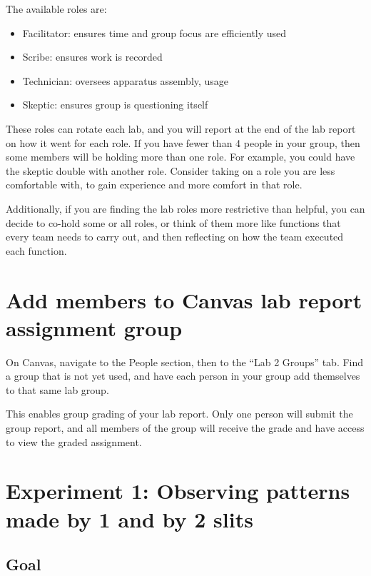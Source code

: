 The available roles are:

\begin{itemize}
	\item Facilitator: ensures time and group focus are efficiently used
	\item Scribe: ensures work is recorded
	\item Technician: oversees apparatus assembly, usage
	\item Skeptic: ensures group is questioning itself
\end{itemize}

These roles can rotate each lab, and you will report at the end of the lab report on how it went for each role. If you have fewer than 4 people in your group, then some members will be holding more than one role. For example, you could have the skeptic double with another role. Consider taking on a role you are less comfortable with, to gain experience and more comfort in that role.

Additionally, if you are finding the lab roles more restrictive than helpful, you can decide to co-hold some or all roles, or think of them more like functions that every team needs to carry out, and then reflecting on how the team executed each function.

\section{Add members to Canvas lab report assignment group}

\begin{steps}
	\item On Canvas, navigate to the People section, then to the ``Lab 2 Groups'' tab. Find a group that is not yet used, and have each person in your group add themselves to that same lab group.
\end{steps}

This enables group grading of your lab report. Only one person will submit the group report, and all members of the group will receive the grade and have access to view the graded assignment.

\section{Experiment 1: Observing patterns made by 1 and by 2 slits}\label{li:sec:exp1}

\subsection{Goal}

